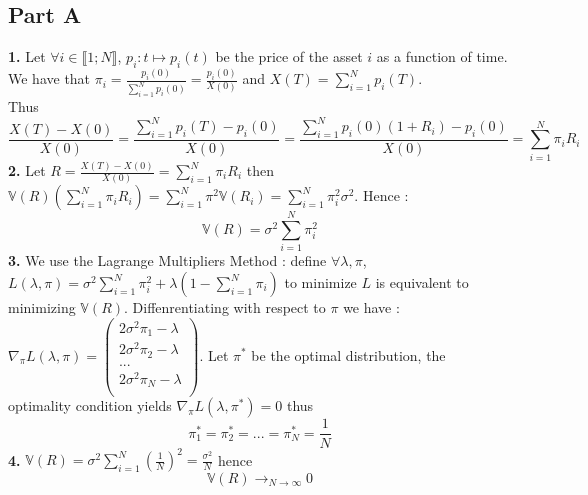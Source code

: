 \documentclass{article}
\begin{document}
\subsection*{Part A}
\textbf{1.} Let $\forall i \in\llbracket 1;N\rrbracket$, $p_i:t\mapsto p_i(t)$ be the price of the asset $i$ as a function of time.
\\
We have that $\pi_i = \frac{p_i(0)}{\sum\limits_{i=1}^N p_i(0)} = \frac{p_i(0)}{X(0)}$ and $X(T) = \sum\limits_{i=1}^N p_i(T)$.
\\
Thus $$\boxed{\frac{X(T)-X(0)}{X(0)} = \frac{\sum_{i=1}^N p_i(T)-p_i(0)}{X(0)} = \frac{\sum_{i=1}^N p_i(0)(1+R_i)-p_i(0)}{X(0)} = \sum\limits_{i=1}^N \pi_iR_i}$$
\textbf{2.} Let $R = \frac{X(T)-X(0)}{X(0)} = \sum\limits_{i=1}^N\pi_iR_i$ then $\mathbb{V}(R)\left(\sum\limits_{i=1}^N\pi_iR_i\right) = \sum\limits_{i=1}^N\pi^2\mathbb{V}(R_i) = \sum\limits_{i=1}^N\pi_i^2\sigma^2$. Hence :$$\boxed{\mathbb{V}(R) = \sigma^2\sum_{i=1}^N\pi_i^2}$$
\textbf{3.} We use the Lagrange Multipliers Method : define $\forall \lambda,\pi$, $L(\lambda,\pi) = \sigma^2\sum_{i=1}^N\pi_i^2 + \lambda\left(1-\sum\limits_{i=1}^N\pi_i\right)$ to minimize $L$ is equivalent to minimizing $\mathbb{V}(R)$. Diffenrentiating with respect to $\pi$ we have : $\nabla_\pi L(\lambda,\pi) = \left(\begin{array}{c}
    2\sigma^2\pi_1-\lambda\\
    2\sigma^2\pi_2-\lambda\\
    ...\\
    2\sigma^2\pi_N-\lambda\\
\end{array}\right)$. Let $\pi^*$ be the optimal distribution, the optimality condition yields $\nabla_\pi L(\lambda,\pi^*) = 0$ thus $$\boxed{\pi^*_1=\pi^*_2=...=\pi^*_N = \frac{1}{N}}$$
\textbf{4.} $\mathbb{V}(R) = \sigma^2\sum\limits_{i=1}^N(\frac{1}{N})^2 = \frac{\sigma^2}{N}$ hence $$\boxed{\mathbb{V}(R)\to_{N\to\infty}0}$$
\end{document}
